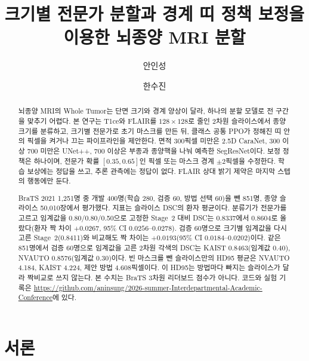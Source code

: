 \documentclass[runningheads]{llncs}
\begin{document}
\title{크기별 전문가 분할과 경계 띠 정책 보정을 이용한 뇌종양 MRI 분할}

\author{안인성 \and 한수진}

\maketitle

\begin{abstract}
뇌종양 MRI의 Whole Tumor는 단면 크기와 경계 양상이 달라, 하나의 분할 모델로 전 구간을 맞추기 어렵다. 본 연구는 T1ce와 FLAIR를 $128\times128$로 줄인 2차원 슬라이스에서 종양 크기를 분류하고, 크기별 전문가로 초기 마스크를 만든 뒤, 클래스 공통 PPO가 정해진 띠 안의 픽셀을 켜거나 끄는 파이프라인을 제안한다. 면적 300픽셀 미만은 2.5D CaraNet, 300 이상 700 미만은 UNet++, 700 이상은 부종과 종양핵을 나눠 예측한 SegResNet이다. 보정 정책은 하나이며, 전문가 확률 $[0.35,0.65]$인 픽셀 또는 마스크 경계 $\pm2$픽셀을 수정한다. 학습 보상에는 정답을 쓰고, 추론 관측에는 정답이 없다. FLAIR 상대 밝기 제약은 마지막 스텝의 행동에만 둔다.

BraTS 2021 1{,}251명 중 개발 400명(학습 280, 검증 60, 방법 선택 60)을 뺀 851명, 종양 슬라이스 50{,}010장에서 평가했다. 지표는 슬라이스 DSC의 환자 평균이다. 분류기가 전문가를 고르고 임계값을 0.80/0.80/0.50으로 고정한 Stage~2 대비 DSC는 0.8337에서 0.8604로 올랐다(환자 짝 차이 $+0.0267$, 95\% CI $0.0256$--$0.0278$). 검증 60명으로 크기별 임계값을 다시 고른 Stage~2(0.8411)와 비교해도 짝 차이는 $+0.0193$(95\% CI $0.0184$--$0.0202$)이다. 같은 851명에서 검증 60명으로 임계값을 고른 2차원 각색의 DSC는 KAIST 0.8463(임계값 0.40), NVAUTO 0.8576(임계값 0.30)이다. 빈 마스크를 뺀 슬라이스만의 HD95 평균은 NVAUTO 4.184, KAIST 4.224, 제안 방법 4.608픽셀이다. 이 HD95는 방법마다 빠지는 슬라이스가 달라 짝비교로 쓰지 않는다. 본 수치는 BraTS 3차원 리더보드 점수가 아니다. 코드와 실험 기록은 \url{https://github.com/aninsung/2026-summer-Interdepartmental-Academic-Conference}에 있다.

\end{abstract}

\section{서론}
\end{document}
